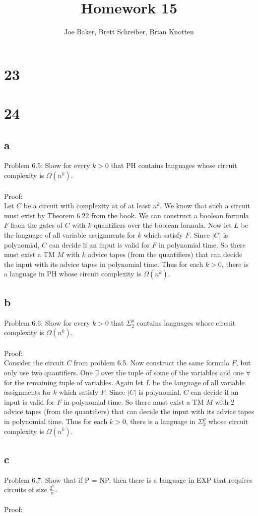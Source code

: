 \documentclass[letterpaper,notitlepage,twoside]{article}
\begin{document}
\title{Homework 15}
\author{Joe Baker, Brett Schreiber, Brian Knotten}
\maketitle

\section*{23}

\section*{24}

\subsection*{a}
Problem 6.5: Show for every $k > 0$ that PH contains languages whose circuit complexity is $\Omega\left(n^k\right)$.
\\\\
Proof:
\\
Let $C$ be a circuit with complexity at of at least $n^k$. We know that such a circuit must exist by Theorem 6.22 from the book. We can construct a boolean formula $F$ from the gates of $C$ with $k$ quantifiers over the boolean formula. Now let $L$ be the language of all variable assignments for $k$ which satisfy $F$. Since $\left| C \right|$ is polynomial, $C$ can decide if an input is valid for $F$ in polynomial time. So there must exist a TM $M$ with $k$ advice tapes (from the quantifiers) that can decide the input with its advice tapes in polynomial time. Thus for each $k > 0$, there is a language in PH whose circuit complexity is $\Omega\left(n^k\right)$.

\subsection*{b}
Problem 6.6: Show for every $k > 0$ that $\Sigma_2^p$ contains languages whose circuit complexity is $\Omega\left(n^k\right)$.
\\\\
Proof:
\\
Consider the circuit $C$ from problem 6.5. Now construct the same formula $F$, but only use two quantifiers. One $\exists$ over the tuple of some of the variables and one $\forall$ for the remaining tuple of variables. Again let $L$ be the language of all variable assignments for $k$ which satisfy $F$. Since $\left| C \right|$ is polynomial, $C$ can decide if an input is valid for $F$ in polynomial time. So there must exist a TM $M$ with 2 advice tapes (from the quantifiers) that can decide the input with its advice tapes in polynomial time. Thus for each $k > 0$, there is a language in $\Sigma_2^p$ whose circuit complexity is $\Omega\left(n^k\right)$.

\subsection*{c}
Problem 6.7: Show that if P = NP, then there is a language in EXP that requires circuits of size $\frac{2^n}{n}$.
\\\\
Proof:
\\
\end{document}
